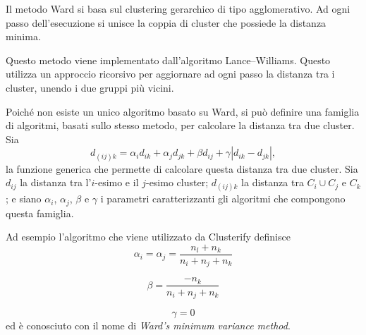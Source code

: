 Il metodo Ward si basa sul clustering gerarchico di tipo agglomerativo. Ad ogni passo dell'esecuzione si unisce la coppia di cluster che possiede la distanza minima. 

Questo metodo viene implementato dall'algoritmo Lance–Williams. Questo utilizza un approccio ricorsivo per aggiornare ad ogni passo la distanza tra i cluster, unendo i due gruppi più vicini.

Poiché non esiste un unico algoritmo basato su Ward, si può definire una famiglia di algoritmi, basati sullo stesso metodo, per calcolare la distanza tra due cluster. Sia
\begin{equation*}
	d_{(ij)k} = \alpha_i d_{ik} + \alpha_j d_{jk} + \beta d_{ij} +  \gamma |d_{ik} - d_{jk}|,  
\end{equation*}
la funzione generica che permette di calcolare questa distanza tra due cluster. Sia $d_{ij}$ la distanza tra l'$i$-esimo e il $j$-esimo cluster; $d_{(ij)k}$ la distanza tra $C_i \cup C_j$ e $C_k$; e siano $\alpha_i$, $\alpha_j$, $\beta$ e $\gamma$ i parametri caratterizzanti gli algoritmi che compongono questa famiglia.

Ad esempio l'algoritmo che viene utilizzato da Clusterify definisce
\begin{equation*}
	\alpha_i = \alpha_j  = \frac{n_l+n_k}{n_i+n_j+n_k}
\end{equation*}

\begin{equation*}
	\beta =\frac{-n_k}{n_i+n_j+n_k}
\end{equation*}

\begin{equation*}
	\gamma = 0
\end{equation*}
ed è conosciuto con il nome di \emph{Ward's minimum variance method}\cite{ward}.